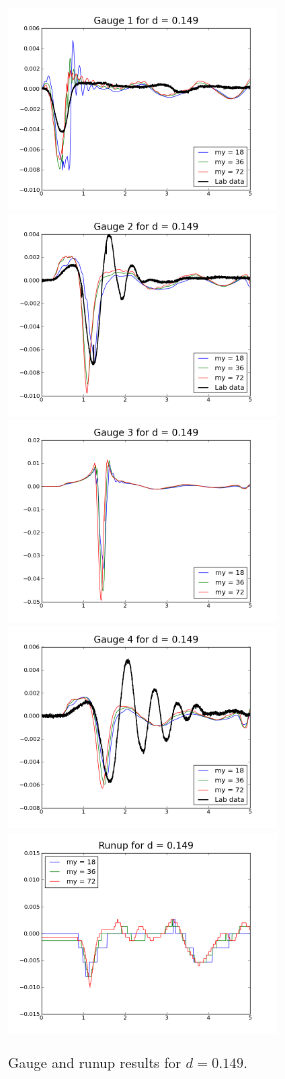 \begin{figure}[ht]

\hfil\includegraphics[width=2.8in]{bp3/gauge1-d0-149.png}\hfil
\hfil\includegraphics[width=2.8in]{bp3/gauge2-d0-149.png}\hfil
\vskip 10pt
\hfil\includegraphics[width=2.8in]{bp3/gauge3-d0-149.png}\hfil
\hfil\includegraphics[width=2.8in]{bp3/gauge4-d0-149.png}\hfil
\vskip 10pt
\hfil\includegraphics[width=2.8in]{bp3/runup-d0-149.png}\hfil

\caption{\label{fig:bp3gauge6} 
Gauge and runup results for $d=0.149$.
  }
\end{figure}



